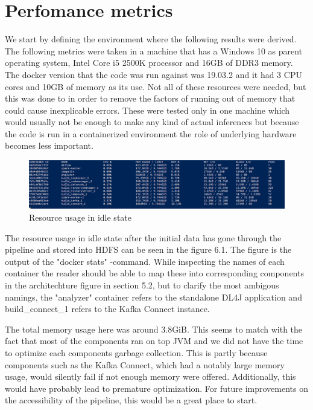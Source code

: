 \section{Perfomance metrics}

We start by defining the environment where the following results were derived.
The following metrics were taken in a machine that has a Windows 10 as parent operating system, Intel Core i5 2500K processor and 16GB of DDR3 memory.
The docker version that the code was run against was 19.03.2 and it had 3 CPU cores and 10GB of memory as its use.
Not all of these resources were needed, but this was done to in order to remove the factors of running out of memory that could cause inexplicable errors.
These were tested only in one machine which would usually not be enough to make any kind of actual inferences but because the code is run in a containerized environment the role of underlying hardware becomes less important.

\begin{figure}[ht!]
    \includegraphics[scale=0.45]{images/memory1} 
    \centering
    \caption{Resource usage in idle state}
\end{figure}

The resource usage in idle state after the initial data has gone through the pipeline and stored into HDFS can be seen in the figure 6.1.
The figure is the output of the "docker stats" -command.
While inspecting the names of each container the reader should be able to map these into corresponding components in the architechture figure in section 5.2, but to clarify the most ambigous namings, the "analyzer" container refers to the standalone DL4J application and build\_connect\_1 refers to the Kafka Connect instance.

The total memory usage here was around 3.8GiB.
This seems to match with the fact that most of the components ran on top JVM and we did not have the time to optimize each components garbage collection. 
This is partly because components such as the Kafka Connect, which had a notably large memory usage, would silently fail if not enough memory were offered.
Additionally, this would have probably lead to premature optimization.
For future improvements on the accessibility of the pipeline, this would be a great place to start.


